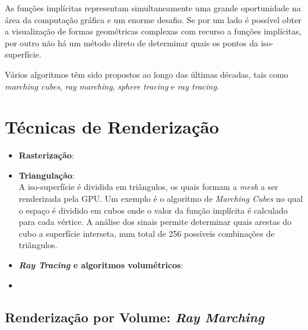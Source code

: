 
As funções implícitas representam simultaneamente uma grande oportunidade na área da computação gráfica e um enorme desafio. Se por um lado é possível obter a visualização de formas geométricas complexas com recurso a funções implícitas, por outro não há um método direto de determinar quais os pontos da iso-superfície.

Vários algoritmos têm sido propostos ao longo das últimas décadas, tais como \textit{marching cubes}\cite{Lorensen1987}, \textit{ray marching}, \textit{sphere tracing}\cite{Hart1996} e \textit{ray tracing}.



\section{Técnicas de Renderização}
\label{sec::arte:render}


\begin{itemize}
	\item \textbf{Rasterização}:\\
	
	\item \textbf{Triangulação}:\\
	A iso-superfície é dividida em triângulos, os quais formam a \textit{mesh} a ser renderizada pela \ac{GPU}. Um exemplo é o algoritmo de \textit{Marching Cubes}\cite{Lorensen1987} no qual o espaço é dividido em cubos onde o valor da função implícita é calculado para cada vértice. A análise dos sinais permite determinar quais arestas do cubo a superfície interseta, num total de 256 possíveis combinações de triângulos.
	
	\item \textbf{\textit{Ray Tracing} e algoritmos volumétricos}:\\
	
	\item \textbf{}
\end{itemize}


\subsection{Renderização por Volume: \emph{Ray Marching}}
\label{ssec::arte:render:raymarch}

